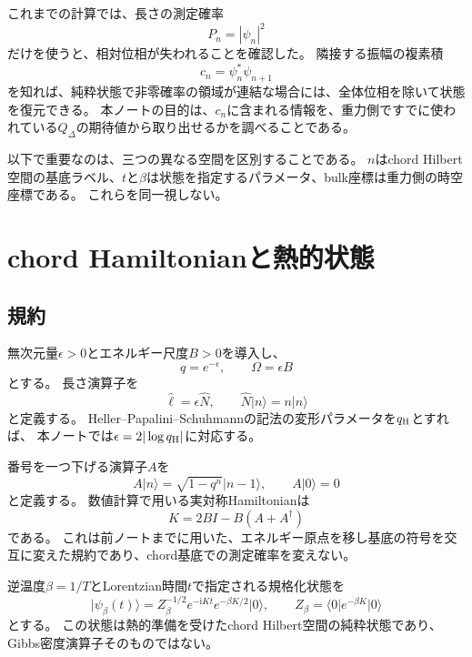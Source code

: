 \documentclass[a4paper,11pt]{ltjsarticle}
\numberwithin{equation}{section}
\newcommand{\ket}[1]{\lvert #1\rangle}
\newcommand{\bra}[1]{\langle #1\rvert}
\newcommand{\ii}{\mathrm i}
\begin{document}
これまでの計算では、長さの測定確率
\begin{equation}
 P_n=|\psi_n|^2
 \label{eq:Pdef}
\end{equation}
だけを使うと、相対位相が失われることを確認した。
隣接する振幅の複素積
\begin{equation}
 c_n=\psi_n^*\psi_{n+1}
 \label{eq:cdef}
\end{equation}
を知れば、純粋状態で非零確率の領域が連結な場合には、全体位相を除いて状態を復元できる。
本ノートの目的は、$c_n$に含まれる情報を、重力側ですでに使われている$Q_\Delta$の期待値から取り出せるかを調べることである。

以下で重要なのは、三つの異なる空間を区別することである。
$n$はchord Hilbert空間の基底ラベル、$t$と$\beta$は状態を指定するパラメータ、bulk座標は重力側の時空座標である。
これらを同一視しない。

\section{chord Hamiltonianと熱的状態}
\subsection{規約}
無次元量$\epsilon>0$とエネルギー尺度$B>0$を導入し、
\begin{equation}
 q=e^{-\epsilon},\qquad \Omega=\epsilon B
 \label{eq:scales}
\end{equation}
とする。
長さ演算子を
\begin{equation}
 \hat\ell=\epsilon\hat N,\qquad \hat N\ket n=n\ket n
 \label{eq:length}
\end{equation}
と定義する。
Heller--Papalini--Schuhmannの記法の変形パラメータを$q_{\rm H}$とすれば、
本ノートでは$\epsilon=2|\log q_{\rm H}|$に対応する\cite{Heller}。

番号を一つ下げる演算子$A$を
\begin{equation}
 A\ket n=\sqrt{1-q^n}\ket{n-1},\qquad A\ket0=0
 \label{eq:A}
\end{equation}
と定義する。
数値計算で用いる実対称Hamiltonianは
\begin{equation}
 K=2B I-B(A+A^\dagger)
 \label{eq:K}
\end{equation}
である。
これは前ノートまでに用いた、エネルギー原点を移し基底の符号を交互に変えた規約であり、chord基底での測定確率を変えない。

逆温度$\beta=1/T$とLorentzian時間$t$で指定される規格化状態を
\begin{equation}
 \ket{\psi_\beta(t)}
 =Z_\beta^{-1/2}e^{-\ii Kt}e^{-\beta K/2}\ket0,
 \qquad
 Z_\beta=\bra0e^{-\beta K}\ket0
 \label{eq:state}
\end{equation}
とする。
この状態は熱的準備を受けたchord Hilbert空間の純粋状態であり、Gibbs密度演算子そのものではない。
\end{document}
